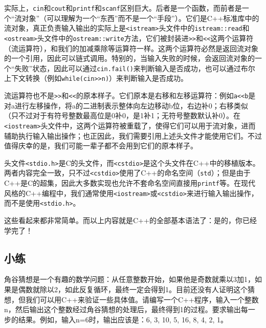 \documentclass[../main.tex]{subfiles}
\begin{document}
\begin{note}
  实际上，\texttt{cin}和\texttt{cout}和\texttt{printf}和\texttt{scanf}区别巨大。后者是一个函数，而前者是一个“流对象”（可以理解为一个“东西”而不是一个“手段”）。它们是C++标准库中的流对象，真正负责输入输出的实际上是\texttt{<istream>}头文件中的\texttt{istream::read}和\texttt{<ostream>}头文件中的\texttt{ostream::write}方法，它们被封装进\texttt{>>}和\texttt{<<}这两个运算符（流运算符），和我们的加减乘除等运算符一样。这两个运算符必然是返回流对象的一个引用，因此可以链式调用。特别的，当输入失败的时候，会返回流对象的一个“失败”状态，因此可以通过\texttt{cin.fail()}来判断输入是否成功，也可以通过布尔上下文转换（例如\texttt{while(cin>>n)}）来判断输入是否成功。

  流运算符也不是\texttt{>>}和\texttt{<<}的原本样子。它们原本是右移和左移运算符：例如\texttt{a<<b}是对a进行左移操作，将a的二进制表示整体向左边移动b位，右边补0；右移类似（只不过对于有符号整数最高位是0补0，是1补1；无符号整数默认补0）。在\texttt{<iostream>}头文件中，这两个运算符被重载了，使得它们可以用于流对象，进而辅助执行输入输出操作；也正因此，我们需要引用上述头文件才能使用它们。不过值得庆幸的是，我们可能一辈子都不会用到它们的原本样子。

  头文件\texttt{<stdio.h>}是C的头文件，而\texttt{<cstdio>}是这个头文件在C++中的移植版本。两者内容完全一致，只不过\texttt{<cstdio>}使用了C++的命名空间（\texttt{std}）；但是由于C++是C的超集，因此大多数实现也允许不套命名空间直接用\texttt{printf}等。在现代风格的C++编程中，我们通常使用\texttt{<iostream>}或\texttt{<cstdio>}来进行输入输出操作，而不是使用\texttt{<stdio.h>}。
\end{note}

这些看起来都非常简单。而以上内容就是C++的全部基本语法了：是的，你已经学完了！

\subsection{小练}

\begin{example}
  角谷猜想是一个有趣的数学问题：从任意整数开始，如果他是奇数就乘以3加1，如果是偶数就除以2，如此反复循环，最终一定会得到1。目前还没有人证明这个猜想，但我们可以用C++来验证一些具体值。请编写一个C++程序，输入一个整数n，然后输出这个整数经过角谷猜想的处理后，最终得到1的过程。要求输出每一步的结果。例如，输入n=6时，输出应该是：6, 3, 10, 5, 16, 8, 4, 2, 1。
\end{example}
\end{document}
